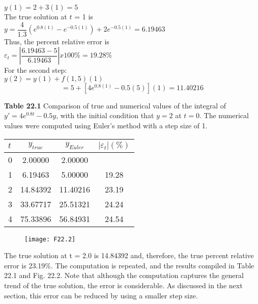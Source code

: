 \documentclass[../main.tex]{subfiles}
\begin{document}
$y(1) = 2 + 3(1) = 5$\\

The true solution at $t$ = 1 is\\

$y=\dfrac{4}{1.3} \left(e^{0.8(1)} - e^{-0.5(1)} \right) + 2e^{-0.5(1)} = 6.19463$\\

Thus, the percent relative error is\\

$\varepsilon_{t} = \left| \dfrac{6.19463 - 5}{6.19463} \right| x 100 \% = 19.28 \% $\\

For the second step:\\

$y(2) = y(1) + f(1,5)(1)$
$$= 5 + [4e^{0.8(1)} - 0.5(5)](1) = 11.40216 $$


\vspace{0,3in}
\textbf{Table 22.1}
Comparison of true and numerical values of the integral
of $y' = 4e^{0.8t} - 0.5y$, with the initial condition that $y = 2$ at $t = 0$. The numerical values were computed using Euler's
method with a step size of 1.\\
\begin{tabular}{lccc}
\hline

	\textbf{$t$} \; \; \; \; \; & \textbf{$y_{true}$} \; \; \; \; \; & \textbf{$y_{Euler}$} \; \; \; \; \; &  \textbf{$\left|\varepsilon_{t}\right|( \% )$}\\
	
\hline

	0 \; \; \; \; \; & 2.00000 \; \; \; \; \; & 2.00000 \; \; \; \; \; & \vspace{0in}\\
	
	1 \; \; \; \; \; & 6.19463 \; \; \; \; \; & 5.00000 \; \; \; \; \; & 19.28\\

	2 \; \; \; \; \; & 14.84392 \; \; \; \; \; & 11.40216 \; \; \; \; \; & 23.19\\

	3 \; \; \; \; \; & 33.67717 \; \; \; \; \; & 25.51321 \; \; \; \; \; & 24.24\\

	4 \; \; \; \; \; & 75.33896 \; \; \; \; \; & 56.84931 \; \; \; \; \; & 24.54\\

\hline
\end{tabular}


\begin{figure}[hbt!]
	\texttt{[image: F22.2]}
	\label{F22.2}
\end{figure}
The true solution at t = 2.0 is 14.84392 and, therefore, the true percent relative error is
23.19\%. The computation is repeated, and the results compiled in Table 22.1 and Fig. 22.2.
Note that although the computation captures the general trend of the true solution, the error
is considerable. As discussed in the next section, this error can be reduced by using a
smaller step size.
\end{document}
